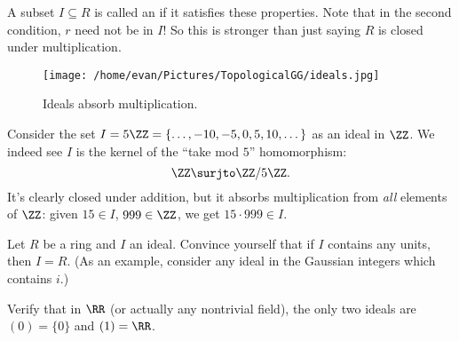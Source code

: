 A subset $I \subseteq R$ is called an  if it satisfies these properties.
Note that in the second condition, $r$ need not be in $I$!
So this is stronger than just saying $R$ is closed under multiplication.

\begin{figure}[ht]
	\centering
	\texttt{[image: /home/evan/Pictures/TopologicalGG/ideals.jpg]}
	\caption{Ideals absorb multiplication.}
\end{figure}

\begin{example}
	Consider the set $I = 5\ZZ = \{\dots,-10,-5,0,5,10,\dots\}$ as an ideal in $\ZZ$.
	We indeed see $I$ is the kernel of the ``take mod $5$'' homomorphism:
	\[ \ZZ \surjto \ZZ/5\ZZ. \]
	It's clearly closed under addition,
	but it absorbs multiplication from \emph{all} elements of $\ZZ$:
	given $15 \in I$, $999 \in \ZZ$, we get $15 \cdot 999 \in I$.
\end{example}

\begin{ques}
	Let $R$ be a ring and $I$ an ideal.
	Convince yourself that if $I$ contains any units, then $I = R$.
	(As an example, consider any ideal in the Gaussian integers
	which contains $i$.)
\end{ques}
\begin{ques}
	Verify that in $\RR$ (or actually any nontrivial field),
	the only two ideals are $(0) = \{0\}$ and $(1) = \RR$.
\end{ques}

